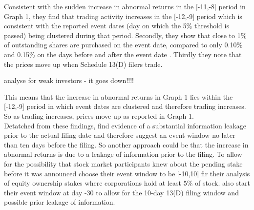 \documentclass[12pt]{article}
\begin{document}
Consistent with the sudden increase in abnormal returns in the [-11,-8] period in Graph 1, they find that trading activity increases in the [-12,-9] period which is consistent with the reported event dates (day on which the 5\% threshold is passed) being clustered during that period. Secondly, they show that close to 1\% of outstanding shares are purchased on the event date, compared to only 0.10\% and 0.15\% on the days before and after the event date \citep[p.1561]{Collin-Dufresne2015}. Thirdly they note that the prices move up when Schedule 13(D) filers trade. 
\begin{center}
	analyse for weak investors - it goes down!!!! 
\end{center}
This means that the increase in abnormal returns in Graph 1 lies within the [-12,-9] period in which event dates are clustered and therefore trading increases. So as trading increases, prices move up as reported in Graph 1.\\ 
Detatched from these findings, \citet[p.31]{Brigida2012} find evidence of a substantial information leakage prior to the actual filing date and therefore suggest an event window no later than ten days before the filing. So another approach could be that the increase in abnormal returns is due to a leakage of information prior to the filing. To allow for the possibility that stock market participants knew about the pending stake before it was announced \citet[p.2802]{Allen2000} choose their event window to be [-10,10] fir their analysis of equity ownership stakes where corporations hold at least 5\% of stock. \citet[p.207]{Klein2009} also start their event window at day -30 to allow for the 10-day 13(D) filing window and possible prior leakage of information.  
\end{document}
